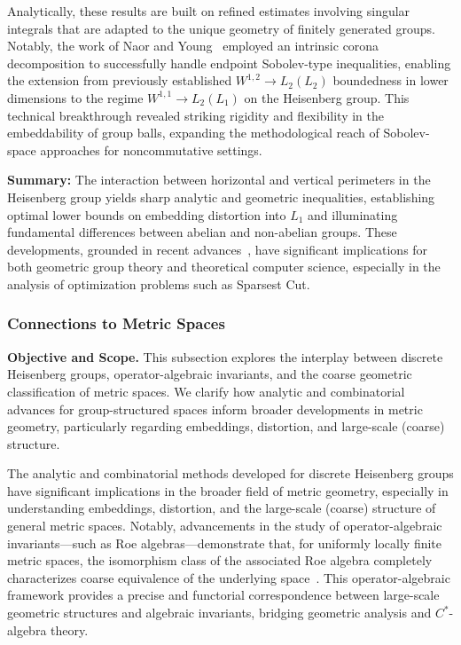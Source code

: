 \documentclass[sigconf]{acmart}
\begin{document}
Analytically, these results are built on refined estimates involving singular integrals that are adapted to the unique geometry of finitely generated groups. Notably, the work of Naor and Young~\cite{ref108} employed an intrinsic corona decomposition to successfully handle endpoint Sobolev-type inequalities, enabling the extension from previously established $W^{1,2}\to L_2(L_2)$ boundedness in lower dimensions to the regime $W^{1,1}\to L_2(L_1)$ on the Heisenberg group. This technical breakthrough revealed striking rigidity and flexibility in the embeddability of group balls, expanding the methodological reach of Sobolev-space approaches for noncommutative settings.

\textbf{Summary:} The interaction between horizontal and vertical perimeters in the Heisenberg group yields sharp analytic and geometric inequalities, establishing optimal lower bounds on embedding distortion into $L_1$ and illuminating fundamental differences between abelian and non-abelian groups. These developments, grounded in recent advances~\cite{ref108}, have significant implications for both geometric group theory and theoretical computer science, especially in the analysis of optimization problems such as Sparsest Cut.

\subsubsection{Connections to Metric Spaces}

\textbf{Objective and Scope.} This subsection explores the interplay between discrete Heisenberg groups, operator-algebraic invariants, and the coarse geometric classification of metric spaces. We clarify how analytic and combinatorial advances for group-structured spaces inform broader developments in metric geometry, particularly regarding embeddings, distortion, and large-scale (coarse) structure.

The analytic and combinatorial methods developed for discrete Heisenberg groups have significant implications in the broader field of metric geometry, especially in understanding embeddings, distortion, and the large-scale (coarse) structure of general metric spaces. Notably, advancements in the study of operator-algebraic invariants—such as Roe algebras—demonstrate that, for uniformly locally finite metric spaces, the isomorphism class of the associated Roe algebra completely characterizes coarse equivalence of the underlying space~\cite{ref52}. This operator-algebraic framework provides a precise and functorial correspondence between large-scale geometric structures and algebraic invariants, bridging geometric analysis and $C^*$-algebra theory.
\end{document}
